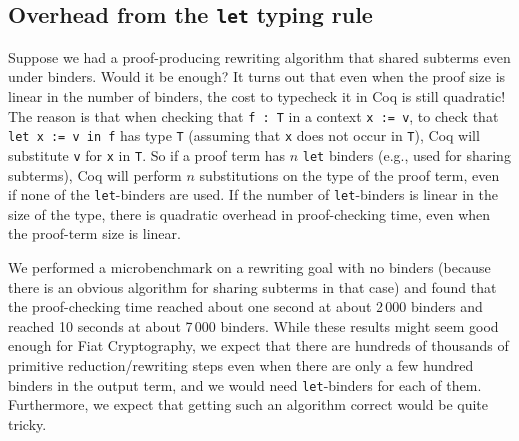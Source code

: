 \begin{subappendices}
\subsection{Overhead from the \texttt{let} typing rule}

Suppose we had a proof-producing rewriting algorithm that shared subterms even under binders.
Would it be enough?
It turns out that even when the proof size is linear in the number of binders, the cost to typecheck it in Coq is still quadratic!
The reason is that when checking that \texttt{f : T} in a context \texttt{x := v}, to check that \texttt{let x := v in f} has type \texttt{T} (assuming that \texttt{x} does not occur in \texttt{T}), Coq will substitute \texttt{v} for \texttt{x} in \texttt{T}.
So if a proof term has $n$ \texttt{let} binders (e.g., used for sharing subterms), Coq will perform $n$ substitutions on the type of the proof term, even if none of the \texttt{let}-binders are used.
If the number of \texttt{let}-binders is linear in the size of the type, there is quadratic overhead in proof-checking time, even when the proof-term size is linear.

We performed a microbenchmark on a rewriting goal with no binders (because there is an obvious algorithm for sharing subterms in that case) and found that the proof-checking time reached about one second at about 2\,000 binders and reached 10 seconds at about 7\,000 binders.
While these results might seem good enough for Fiat Cryptography, we expect that there are hundreds of thousands of primitive reduction/rewriting steps even when there are only a few hundred binders in the output term, and we would need \texttt{let}-binders for each of them.
Furthermore, we expect that getting such an algorithm correct would be quite tricky.


\end{subappendices}
